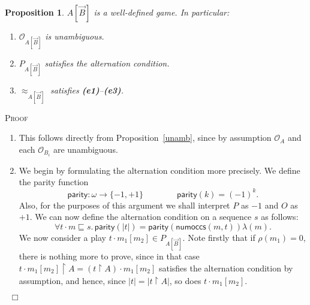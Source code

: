 \documentclass[a4paper,11pt]{article}
\newcommand{\gequiv}{\approx}
\newtheorem{proposition}{Proposition}[section]
\newcommand{\numoccs}[2]{\mathsf{numoccs}(#1 , #2 )}
\newcommand{\parity}{\mathsf{parity}}
\newcommand{\restrict}{{\upharpoonright}}
\newcommand{\Occ}{\mathcal{O}}
\newenvironment{proof}{\textsc{Proof}\ }{$\;\; \Box$}
\begin{document}
\begin{proposition} $A[\vec{B}]$ is a well-defined game. In particular:
\begin{enumerate}
\item $\Occ_{A[\vec{B}]}$ is unambiguous.
\item $P_{A[\vec{B}]}$ satisfies the alternation condition.
\item $\gequiv_{A[\vec{B}]}$ satisfies \textbf{(e1)}--\textbf{(e3)}.
\end{enumerate}
\end{proposition}
\begin{proof}
\begin{enumerate}
\item This follows directly from Proposition~\ref{unamb}, since by assumption $\Occ_A$ and each $\Occ_{B_i}$ are unambiguous.

\item We begin by  formulating the alternation condition more precisely. We define the parity function
\[ \parity : \omega \longrightarrow \{ -1, +1 \}  \qquad \qquad \parity (k) = (-1)^k . \]
Also, for the purposes of this argument we shall interpret $P$ as $-1$ and $O$
 as $+1$. We can now define the alternation condition on a sequence $s$ as follows:
\[ \forall t \cdot m \sqsubseteq s. \, \parity (|t|) = \parity (\numoccs{m}{t})\lambda (m) . \]
We now consider a play $t \cdot m_1[m_2] \in P_{A[\vec{B}]}$.
Note firstly that if $\rho (m_1 ) = 0$, there is nothing more to prove, since in that case $t \cdot m_1[m_2] \restrict A = (t \restrict A) \cdot m_1[m_2]$ satisfies the alternation condition by assumption, and hence, since $|t| = |t \restrict A|$, so does $t \cdot m_1[m_2]$.


\end{enumerate}
\end{proof}
\end{document}
